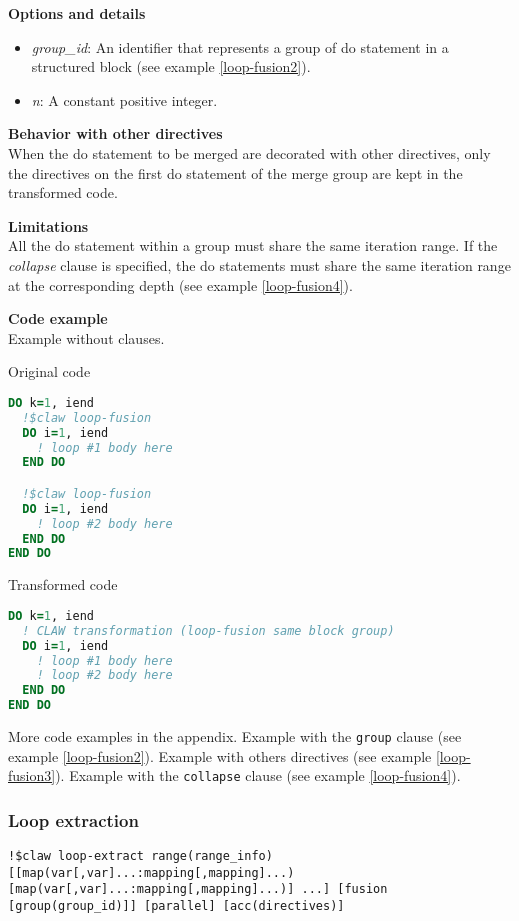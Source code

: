 \textbf{Options and details}
\begin{itemize}
\item \textit{group\_id}: An identifier that represents a group of do statement
in a structured block (see example \ref{loop-fusion2}).
\item \textit{n}: A constant positive integer.
\end{itemize}

\textbf{Behavior with other directives}\\
When the do statement to be merged are decorated with other directives, only the
directives on the first do statement of the merge group are kept in the
transformed code.

\textbf{Limitations}\\
All the do statement within a group must share the same iteration range. If the
\textit{collapse} clause is specified, the do statements must share the same
iteration range at the corresponding depth (see example \ref{loop-fusion4}).

\textbf{Code example}\\
\label{loop-fusion-1}
Example without clauses.

Original code
\begin{lstlisting}[language=Fortran]
DO k=1, iend
  !$claw loop-fusion
  DO i=1, iend
    ! loop #1 body here
  END DO

  !$claw loop-fusion
  DO i=1, iend
    ! loop #2 body here
  END DO
END DO
\end{lstlisting}

Transformed code
\begin{lstlisting}[language=Fortran]
DO k=1, iend
  ! CLAW transformation (loop-fusion same block group)
  DO i=1, iend
    ! loop #1 body here
    ! loop #2 body here
  END DO
END DO
\end{lstlisting}

More code examples in the appendix. Example with the \lstinline!group! clause
(see example \ref{loop-fusion2}). Example with others directives (see example
\ref{loop-fusion3}). Example with the \lstinline!collapse! clause (see example
\ref{loop-fusion4}).

\subsubsection{Loop extraction}
\begin{lstlisting}
!$claw loop-extract range(range_info) [[map(var[,var]...:mapping[,mapping]...) [map(var[,var]...:mapping[,mapping]...)] ...] [fusion [group(group_id)]] [parallel] [acc(directives)]
\end{lstlisting}

